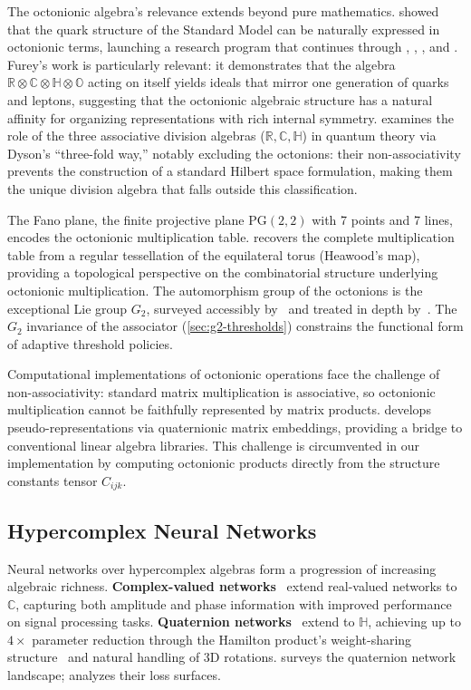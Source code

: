 \documentclass[11pt,a4paper]{article}
\theoremstyle{definition}
\theoremstyle{remark}
\newcommand{\Oct}{\mathbb{O}}
\newcommand{\Real}{\mathbb{R}}
\newcommand{\Comp}{\mathbb{C}}
\newcommand{\Quat}{\mathbb{H}}
\begin{document}
The octonionic algebra's relevance extends beyond pure mathematics. \citet{GunaydinGursey1973} showed that the quark structure of the Standard Model can be naturally expressed in octonionic terms, launching a research program that continues through \citet{Dixon1994}, \citet{Furey2016,Furey2018}, \citet{Todorov2018}, and \citet{Boyle2020}. Furey's work is particularly relevant: it demonstrates that the algebra $\Real \otimes \Comp \otimes \Quat \otimes \Oct$ acting on itself yields ideals that mirror one generation of quarks and leptons, suggesting that the octonionic algebraic structure has a natural affinity for organizing representations with rich internal symmetry. \citet{Baez2012} examines the role of the three associative division algebras ($\Real, \Comp, \Quat$) in quantum theory via Dyson's ``three-fold way,'' notably excluding the octonions: their non-associativity prevents the construction of a standard Hilbert space formulation, making them the unique division algebra that falls outside this classification.

The Fano plane, the finite projective plane $\text{PG}(2,2)$ with 7 points and 7 lines, encodes the octonionic multiplication table. \citet{Sevennec2013} recovers the complete multiplication table from a regular tessellation of the equilateral torus (Heawood's map), providing a topological perspective on the combinatorial structure underlying octonionic multiplication. The automorphism group of the octonions is the exceptional Lie group $G_2$, surveyed accessibly by~\citet{Agricola2008} and treated in depth by~\citet{Harvey1990}. The $G_2$ invariance of the associator (\cref{sec:g2-thresholds}) constrains the functional form of adaptive threshold policies.

Computational implementations of octonionic operations face the challenge of non-associativity: standard matrix multiplication is associative, so octonionic multiplication cannot be faithfully represented by matrix products. \citet{Tian2000} develops pseudo-representations via quaternionic matrix embeddings, providing a bridge to conventional linear algebra libraries. This challenge is circumvented in our implementation by computing octonionic products directly from the structure constants tensor $C_{ijk}$.

\subsection{Hypercomplex Neural Networks}

Neural networks over hypercomplex algebras form a progression of increasing algebraic richness. \textbf{Complex-valued networks}~\citep{Hirose2012,Trabelsi2018} extend real-valued networks to $\Comp$, capturing both amplitude and phase information with improved performance on signal processing tasks. \textbf{Quaternion networks}~\citep{Gaudet2018,Zhu2018,Parcollet2019,Xu2015} extend to $\Quat$, achieving up to $4\times$ parameter reduction through the Hamilton product's weight-sharing structure~\citep{Parcollet2020} and natural handling of 3D rotations. \citet{Parcollet2020} surveys the quaternion network landscape; \citet{Bill2024} analyzes their loss surfaces.
\end{document}
